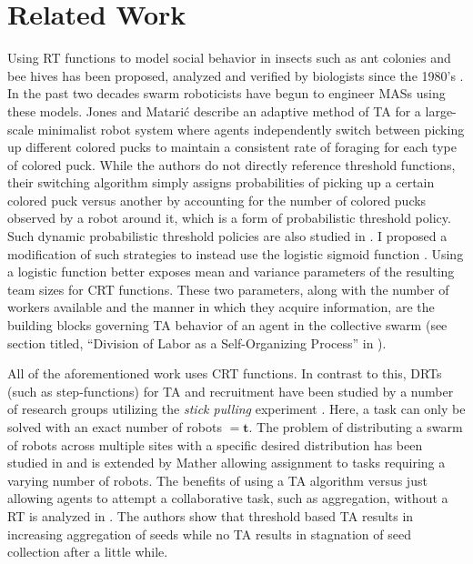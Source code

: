 \documentclass[defaultstyle,12pt]{proposal}
\def\td{\mathbf{t}}   %
\begin{document}
\section{Related Work}\label{sec:relwork}
Using RT functions to model social behavior in insects such as ant colonies \cite{Bonabeau1996, Bonabeau1997} and bee hives \cite{Robinson1987, Robinson1992, PageJr1990} has been proposed, analyzed and verified by biologists since the 1980's \cite{Theraulaz1998}. In the past two decades swarm roboticists have begun to engineer MASs using these models. Jones and Matari\'c \cite{Jones2004} describe an adaptive method of TA for a large-scale minimalist robot system where agents independently switch between picking up different colored pucks to maintain a consistent rate of foraging for each type of colored puck. While the authors do not directly reference threshold functions, their switching algorithm simply assigns probabilities of picking up a certain colored puck versus another by accounting for the number of colored pucks observed by a robot around it, which is a form of probabilistic threshold policy. Such dynamic probabilistic threshold policies are also studied in \cite{Nouyan2002}. I proposed a modification of such strategies to instead use the logistic sigmoid function \cite{Kanakia2014}. Using a logistic function better exposes mean and variance parameters of the resulting team sizes for CRT functions. These two parameters, along with the number of workers available and the manner in which they acquire information, are the building blocks governing TA behavior of an agent in the collective swarm (see section titled, ``Division of Labor as a Self-Organizing Process'' in \cite{Robinson1992}).

All of the aforementioned work uses CRT functions. In contrast to this, DRTs (such as step-functions) for TA and recruitment have been studied by a number of research groups utilizing the \emph{stick pulling} experiment \cite{Martinoli1995, Martinoli1998, Lerman2001, Martinoli2004}. Here, a task can only be solved with an exact number of robots $= \td$. The problem of distributing a swarm of robots across multiple sites with a specific desired distribution has been studied in \cite{Berman2009, Correll2008} and is extended by Mather \cite{Mather2010} allowing assignment to tasks requiring a varying number of robots. The benefits of using a TA algorithm versus just allowing agents to attempt a collaborative task, such as aggregation, without a RT is analyzed in \cite{Agassounon2001}. The authors show that threshold based TA results in increasing aggregation of seeds while no TA results in stagnation of seed collection after a little while. 
\end{document}
